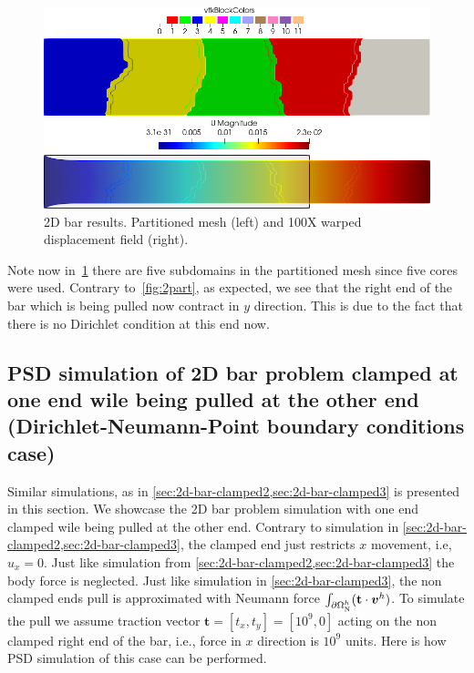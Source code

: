 \documentclass{report}
\newcommand{\bvh}{\boldsymbol v^h}
\begin{document}
\begin{figure}[htbp]
    \centering
    \begin{minipage}[t][2cm][t]{0.36\textwidth}
    \includegraphics[align=b,width=1\textwidth]{./Images/2d-bar-partitioned5.png}
    \end{minipage}\hspace{.1\textwidth}
    \begin{minipage}[t][2cm][t]{0.5\textwidth}
    \includegraphics[align=b,width=1\textwidth]{./Images/2d-bar-clamped-traction.png}
    \end{minipage}
    \caption{2D bar results. Partitioned mesh (left) and 100X warped displacement field (right).}
    \label{fig:5part}
\end{figure}

Note now in~\cref{fig:5part} there are five subdomains in the partitioned mesh since five cores were used. Contrary to~\cref{fig:2part}, as expected, we see that the right end of the bar which is being pulled now contract in $y$ direction. This is due to the fact that there is no Dirichlet condition at this end now. 

\pagebreak




\subsection{PSD simulation of 2D bar problem clamped at one end wile being pulled at the other end (Dirichlet-Neumann-Point boundary conditions case)\label{sec:2d-bar-clamped4}}


Similar simulations, as in \cref{sec:2d-bar-clamped2,sec:2d-bar-clamped3} is presented in this section. We showcase the 2D bar problem simulation with one end clamped  wile being pulled at the other end. Contrary to simulation in \cref{sec:2d-bar-clamped2,sec:2d-bar-clamped3}, the clamped end just restricts $x$ movement, i.e, $u_x=0$. Just like simulation from \cref{sec:2d-bar-clamped2,sec:2d-bar-clamped3} the body force is neglected. Just like simulation in  \cref{sec:2d-bar-clamped3}, the non clamped ends pull is approximated with Neumann force $\int_{\partial\Omega^h_{\text N}}(\mathbf t\cdot \bvh)$. To simulate the pull we assume traction vector $\mathbf t=[t_x,t_y]=[10^9,0]$ acting on the non clamped right end of the bar, i.e., force in $x$ direction is $10^9$ units. Here is how PSD simulation of this case can be performed.
\end{document}
